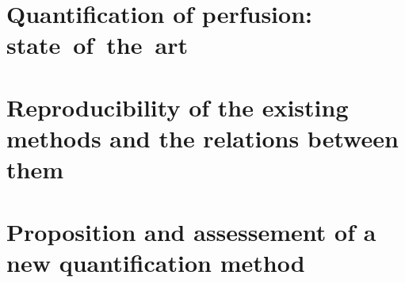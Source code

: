 \documentclass[12pt,vi,twoside]{mitthesis}
\begin{document}


\pagestyle{plain}


\pagestyle{fancyplain}
\addtolength{\headheight}{\baselineskip}
\renewcommand{\headrulewidth}{0.6pt}



\part{Quantification of perfusion: state~of~the~art}

\part{Reproducibility of the existing methods and the relations between them}

\part{Proposition and assessement of a new quantification method}





\clearpage
\appendix


%
%
%
\end{document}
